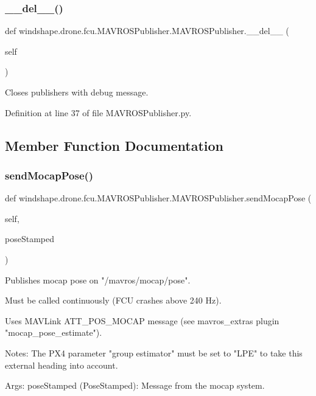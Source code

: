\subsubsection{\texorpdfstring{\+\_\+\+\_\+del\+\_\+\+\_\+()}{\_\_del\_\_()}}
{\footnotesize\ttfamily def windshape.\+drone.\+fcu.\+M\+A\+V\+R\+O\+S\+Publisher.\+M\+A\+V\+R\+O\+S\+Publisher.\+\_\+\+\_\+del\+\_\+\+\_\+ (\begin{DoxyParamCaption}\item[{}]{self }\end{DoxyParamCaption})}

\begin{DoxyVerb}Closes publishers with debug message.\end{DoxyVerb}
 

Definition at line 37 of file M\+A\+V\+R\+O\+S\+Publisher.\+py.



\subsection{Member Function Documentation}
\mbox{\label{classwindshape_1_1drone_1_1fcu_1_1_m_a_v_r_o_s_publisher_1_1_m_a_v_r_o_s_publisher_a7d835864fcf0ea245f8ac865fe20f8e0}} 
\subsubsection{\texorpdfstring{send\+Mocap\+Pose()}{sendMocapPose()}}
{\footnotesize\ttfamily def windshape.\+drone.\+fcu.\+M\+A\+V\+R\+O\+S\+Publisher.\+M\+A\+V\+R\+O\+S\+Publisher.\+send\+Mocap\+Pose (\begin{DoxyParamCaption}\item[{}]{self,  }\item[{}]{pose\+Stamped }\end{DoxyParamCaption})}

\begin{DoxyVerb}Publishes mocap pose on "/mavros/mocap/pose".

Must be called continuously (FCU crashes above 240 Hz).

Uses MAVLink ATT_POS_MOCAP message (see mavros_extras plugin
"mocap_pose_estimate").

Notes:
    The PX4 parameter "group estimator" must be set to "LPE" to
    take this external heading into account.

Args:
    poseStamped (PoseStamped): Message from the mocap system.
\end{DoxyVerb}
 

